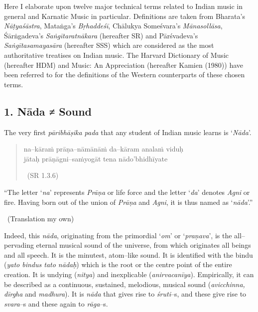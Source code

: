 Here I elaborate upon twelve major technical terms related to Indian music in general and Karnatic Music in particular. Definitions are taken from Bharata’s \textit{Nāṭyaśāstra}, Mataṅga’s \textit{Bṛhaddeśī}, Chālukya Someśvara’s \textit{Mānasollāsa}, Śārṅgadeva’s \textit{Saṅgītaratnākara} (hereafter SR) and Pārśvadeva’s \textit{Saṅgītasamayasāra} (hereafter SSS) which are considered as the most authoritative treatises on Indian music. The Harvard Dictionary of Music (hereafter HDM) and Music: An Appreciation (hereafter Kamien (1980)) have been referred to for the definitions of the Western counterparts of these chosen terms.

\subsection*{1. Nāda ≠ Sound}

The very first \textit{pāribhāṣika pada} that any student of Indian music learns is ‘\textit{Nāda}’.

\begin{verse}
na–kāraṁ prāṇa–nāmānāṁ da–kāram analaṁ viduḥ \\ jātaḥ prāṇāgni–saṁyogāt tena nādo’bhidhīyate  

~\hfill (SR 1.3.6)
\end{verse}

\begin{myquote}
“The letter ‘\textit{na}’ represents \textit{Prāṇa} or life force and the letter ‘\textit{da}’ denotes \textit{Agni} or fire. Having born out of the union of \textit{Prāṇa} and \textit{Agni}, it is thus named as ‘\textit{nāda}’.” 

~\hfill (Translation my own)
\end{myquote}

Indeed, this \textit{nāda}, originating from the primordial ‘\textit{om}’ or ‘\textit{praṇava}’, is the all–pervading eternal musical sound of the universe, from which originates all beings and all speech. It is the minutest, atom–like sound. It is identified with the bindu (\textit{yato bindus tato nādaḥ}) which is the root or the centre point of the entire creation. It is undying (\textit{nitya}) and inexplicable (\textit{anirvacanīya}). Empirically, it can be described as a continuous, sustained, melodious, musical sound (\textit{avicchinna, dīrgha} and \textit{madhura}). It is \textit{nāda} that gives rise to \textit{śruti}–s, and these give rise to \textit{svara}–s and these again to \textit{rāga}–s.

